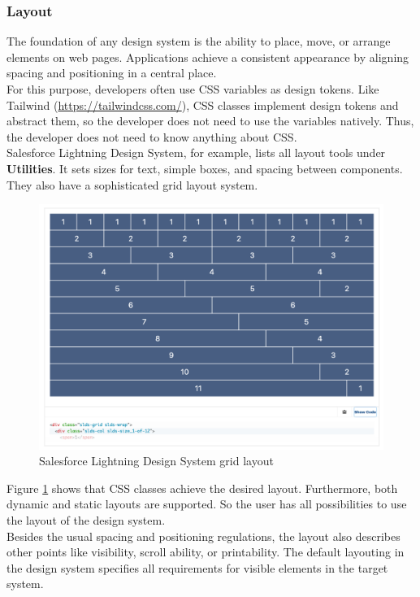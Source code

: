 \subsubsection{Layout} \label{layout}
The foundation of any design system is the ability to place, move, or arrange elements on web pages. Applications achieve a consistent appearance by aligning spacing and positioning in a central place. \\ 
For this purpose, developers often use \ac{CSS} variables as design tokens. 
Like Tailwind (\url{https://tailwindcss.com/}), CSS classes implement design tokens and abstract them, so the developer does not need to use the variables natively. Thus, the developer does not need to know anything about \ac{CSS}.  \\
Salesforce Lightning Design System, for example, lists all layout tools under \textbf{Utilities}. It sets sizes for text, simple boxes, and spacing between components. They also have a sophisticated grid layout system.  \\
\begin{figure}[hbtp]
	\centerline{\includegraphics[width=\linewidth]{images/salesforce_lightning_layout.png}}
	\caption{Salesforce Lightning Design System grid layout \cite{lightning_design_system_lightning_nodate}}
	\label{salesforce_lightning_layout}
\end{figure} 

Figure \ref{salesforce_lightning_layout} shows that \ac{CSS} classes achieve the desired layout. Furthermore, both dynamic and static layouts are supported. So the user has all possibilities to use the layout of the design system.\\
Besides the usual spacing and positioning regulations, the layout also describes other points like visibility, scroll ability, or printability. The default layouting in the design system specifies all requirements for visible elements in the target system.

